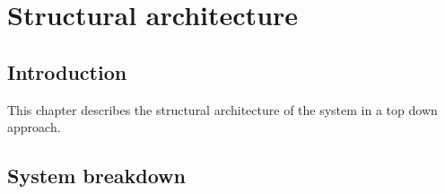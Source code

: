 \chapter{Structural architecture}

\section{Introduction}
This chapter describes the structural architecture of the system in a top down approach.\\

\section{System breakdown}

